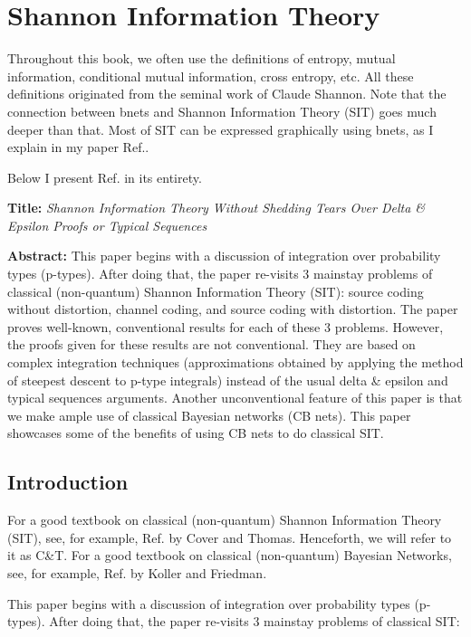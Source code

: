 \chapter{Shannon Information Theory}
\label{ch-shannon-info}

Throughout this book, we often use
the definitions of entropy, mutual information,
conditional mutual information, cross entropy, etc.
All these definitions originated from the seminal work
of Claude Shannon. Note that the
connection between bnets and Shannon Information Theory (SIT)
goes much deeper than that.
Most of SIT can be expressed graphically
using bnets, as I explain in
 my paper Ref.\cite{tucci-shannon-info}.

Below I present Ref.\cite{tucci-shannon-info} in its entirety.


{\bf Title:} {\it Shannon Information Theory
Without Shedding Tears
Over Delta \& Epsilon Proofs
or Typical Sequences}




{\bf Abstract:}
This paper begins with a
discussion of integration
over probability types (p-types).
After doing that, the paper re-visits
3 mainstay problems of classical (non-quantum)
Shannon Information Theory (SIT):
source coding without distortion,
channel coding,
and source coding with distortion.
The paper proves
well-known, conventional results for
each of these 3 problems. However,
the proofs given for these results
are not conventional. They
are based on complex integration techniques
(approximations obtained by applying
the method of steepest descent to
p-type integrals)
instead of the usual delta \& epsilon
and typical sequences
arguments.
Another
unconventional feature
of this paper
is that we make ample
use of classical Bayesian networks (CB nets).
This paper showcases
some of the benefits of using
CB nets to do classical SIT.




\newpage

\section{Introduction}

For a good textbook on classical (non-quantum)
Shannon
Information Theory (SIT), see, for example,
Ref.\cite{CovTh}
by Cover and Thomas.
Henceforth, we will refer to
it
as C\&T.
For a good textbook on classical (non-quantum)
Bayesian Networks, see, for example,
Ref.\cite{KF}
by Koller and Friedman.

This paper begins with a
discussion of integration
over probability types (p-types).
After doing that, the paper re-visits
3 mainstay problems of classical
SIT:

